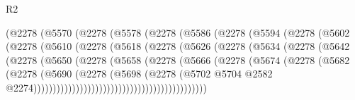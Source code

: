 \begin{lexlean}{R2}
\begin{coremodule}
                      (@2278
                        (@5570
                          (@2278
                            (@5578
                              (@2278
                                (@5586
                                  (@2278
                                    (@5594
                                      (@2278
                                        (@5602
                                          (@2278
                                            (@5610
                                              (@2278
                                                (@5618
                                                  (@2278
                                                    (@5626
                                                      (@2278
                                                        (@5634
                                                          (@2278
                                                            (@5642
                                                              (@2278
                                                                (@5650
                                                                  (@2278
                                                                    (@5658
                                                                      (@2278
                                                                        (@5666
                                                                          (@2278
                                                                            (@5674
                                                                              (@2278
                                                                                (@5682
                                                                                  (@2278
                                                                                    (@5690
                                                                                      (@2278
                                                                                        (@5698
                                                                                          (@2278
                                                                                            (@5702
                                                                                              @5704
                                                                                              @2582
                                                                                              @2274)))))))))))))))))))))))))))))))))))))))))))))

\end{coremodule}
\end{lexlean}
